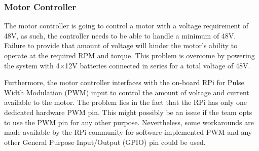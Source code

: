 \begin{table}[H]
\caption{\label{tab:tumbr_controls} TUMBR Controls Failure Modes \& Probabilities}
\centering

\end{table}

\subsubsection*{Motor Controller}

\indent\indent The motor controller is going to control a motor with a voltage requirement of 48V, as such, the controller needs to be able to handle a minimum of 48V. Failure to provide that amount of voltage will hinder the motor's ability to operate at the required RPM and torque. This problem is overcome by powering the system with 4$\times$12V batteries connected in series for a total voltage of 48V.

Furthermore, the motor controller interfaces with the on-board RPi for Pulse Width Modulation (PWM) input to control the amount of voltage and current available to the motor. The problem lies in the fact that the RPi has only one dedicated hardware PWM pin. This might possibly be an issue if the team opts to use the PWM pin for any other purpose. Nevertheless, some workarounds are made available by the RPi community for software implemented PWM and any other General Purpose Input/Output (GPIO) pin could be used.


